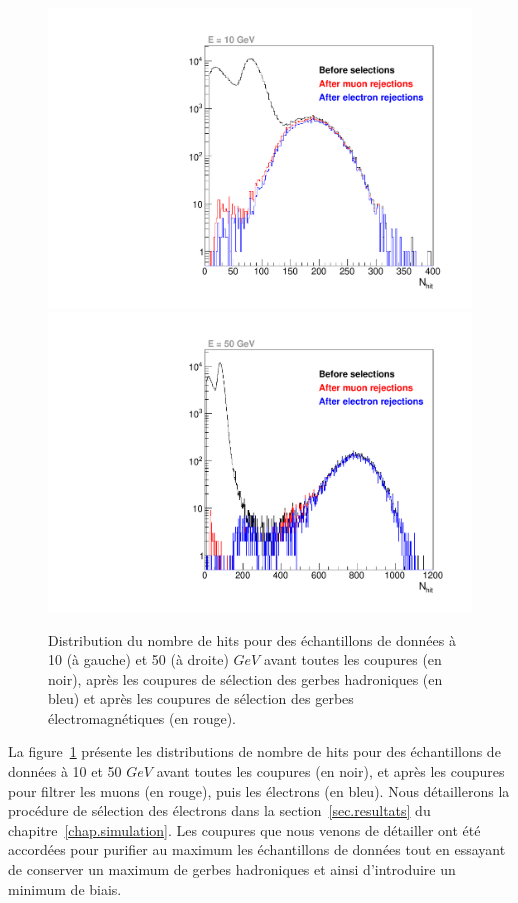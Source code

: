 \label{sec.shower_selection}
\begin{figure}[!ht]
  \begin{center}
    \includegraphics[width=.45\textwidth]{SDHCAL/figs/pi-_selection10GeV.pdf}
    \includegraphics[width=.45\textwidth]{SDHCAL/figs/pi-_selection50GeV.pdf}
    \caption{Distribution du nombre de hits pour des échantillons de données à 10 (à gauche) et 50 (à droite) $GeV$ avant toutes les coupures (en noir), après les coupures de sélection des gerbes hadroniques (en bleu) et après les coupures de sélection des gerbes électromagnétiques (en rouge).}
    \label{fig:pion_selection}
  \end{center}
\end{figure}
La figure~\ref{fig:pion_selection} présente les distributions de nombre de hits pour des échantillons de données à 10 et 50 $GeV$ avant toutes les coupures (en noir), et après les coupures pour filtrer les muons (en rouge), puis les électrons (en bleu). Nous détaillerons la procédure de sélection des électrons dans la section~\ref{sec.resultats} du chapitre~\ref{chap.simulation}. Les coupures que nous venons de détailler ont été accordées pour purifier au maximum les échantillons de données tout en essayant de conserver un maximum de gerbes hadroniques et ainsi d'introduire un minimum de biais.
